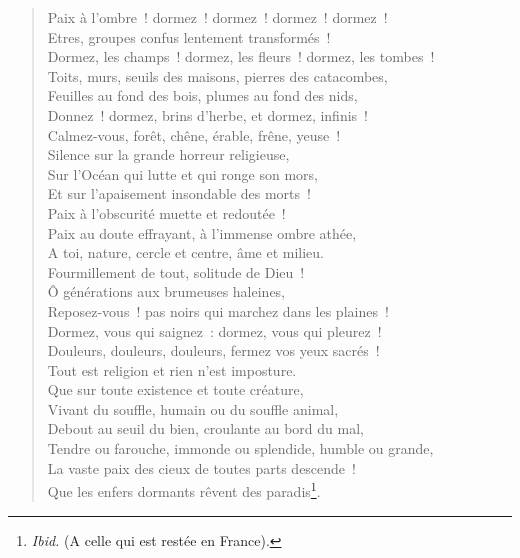 \documentclass[french,twoside]{book} %
\begin{document}
\begin{verse}
Paix à l’ombre ! dormez ! dormez ! dormez ! dormez !\\
Etres, groupes confus lentement transformés !\\
Dormez, les champs ! dormez, les fleurs ! dormez, les tombes !\\
Toits, murs, seuils des maisons, pierres des catacombes,\\
Feuilles au fond des bois, plumes au fond des nids,\\
Donnez ! dormez, brins d’herbe, et dormez, infinis !\\
Calmez-vous, forêt, chêne, érable, frêne, yeuse !\\
Silence sur la grande horreur religieuse,\\
Sur l’Océan qui lutte et qui ronge son mors,\\
Et sur l’apaisement insondable des morts !\\
Paix à l’obscurité muette et redoutée !\\
Paix au doute effrayant, à l’immense ombre athée,\\
A toi, nature, cercle et centre, âme et milieu.\\
Fourmillement de tout, solitude de Dieu !\\
Ô générations aux brumeuses haleines,\\
Reposez-vous ! pas noirs qui marchez dans les plaines !\\
Dormez, vous qui saignez : dormez, vous qui pleurez !\\
Douleurs, douleurs, douleurs, fermez vos yeux sacrés !\\
Tout est religion et rien n’est imposture.\\
Que sur toute existence et toute créature,\\
Vivant du souffle, humain ou du souffle animal,\\
Debout au seuil du bien, croulante au bord du mal,\\
Tendre ou farouche, immonde ou splendide, humble ou grande,\\
La vaste paix des cieux de toutes parts descende !\\
Que les enfers dormants rêvent des paradis\footnote{\emph{Ibid.} (A celle qui est restée en France).}.\\
\end{verse}
\end{document}
